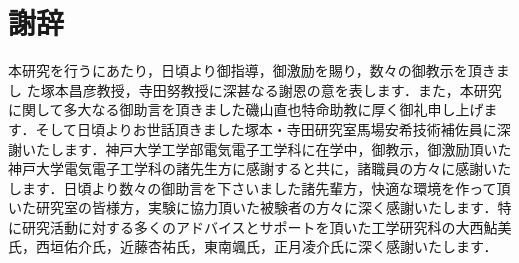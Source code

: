 \section*{謝辞}

本研究を行うにあたり，日頃より御指導，御激励を賜り，数々の御教示を頂きまし
た塚本昌彦教授，寺田努教授に深甚なる謝恩の意を表します．また，本研究に関して多大なる御助言を頂きました磯山直也特命助教に厚く御礼申し上げます．そして日頃よりお世話頂きました塚本・寺田研究室馬場安希技術補佐員に深謝いたします．神戸大学工学部電気電子工学科に在学中，御教示，御激励頂いた神戸大学電気電子工学科の諸先生方に感謝すると共に，諸職員の方々に感謝いたします．日頃より数々の御助言を下さいました諸先輩方，快適な環境を作って頂いた研究室の皆様方，実験に協力頂いた被験者の方々に深く感謝いたします．特に研究活動に対する多くのアドバイスとサポートを頂いた工学研究科の大西鮎美氏，西垣佑介氏，近藤杏祐氏，東南颯氏，正月凌介氏に深く感謝いたします．